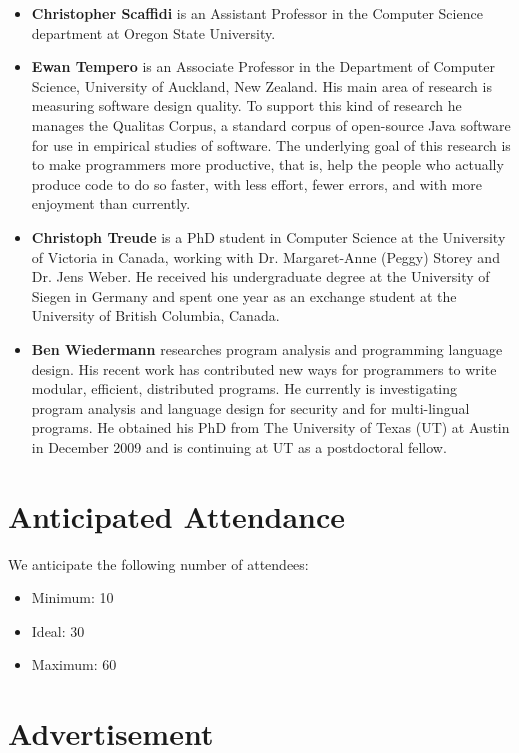 \documentclass[authorpermission]{sigplanconf}
\begin{document}
\begin{itemize}
\item \textbf{Christopher Scaffidi} is an Assistant Professor in the Computer
Science department at Oregon State University.

\item \textbf{Ewan Tempero} is an Associate Professor in the
  Department of Computer Science, University of Auckland, New
  Zealand. His main area of research is measuring software design
  quality. To support this kind of research he manages the Qualitas
  Corpus, a standard corpus of open-source Java software for use in
  empirical studies of software. The underlying goal of this research
  is to make programmers more productive, that is, help the people who
  actually produce code to do so faster, with less effort, fewer
  errors, and with more enjoyment than currently.

\item \textbf{Christoph Treude} is a PhD student in Computer Science at the 
University of Victoria in Canada, working with Dr. Margaret-Anne (Peggy) 
Storey and Dr. Jens Weber. He received his undergraduate degree at the 
University of Siegen in Germany and spent one year as an exchange student at the 
University of British Columbia, Canada.

\item \textbf{Ben Wiedermann} researches program analysis and programming language  
design. His recent work has contributed new ways for programmers to  
write modular, efficient, distributed programs. He currently is  
investigating program analysis and language design for security and  
for multi-lingual programs. He obtained his PhD from The University of  
Texas (UT) at Austin in December 2009 and is continuing at UT as a  
postdoctoral fellow.

\end{itemize}

\section{Anticipated Attendance}

We anticipate the following number of attendees:

\begin{itemize}
\item Minimum: 10 
\item Ideal: 30
\item Maximum: 60 
\end{itemize}

\section{Advertisement}
\end{document}
